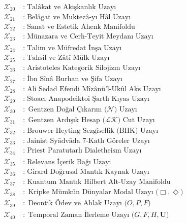 \documentclass[11pt, a4paper]{article}
\begin{document}
\begin{align}
\mathcal{X}_{20} \;&:\; \text{Talâkat ve Akışkanlık Uzayı} \\
\mathcal{X}_{21} \;&:\; \text{Belâgat ve Muktezâ-yı Hâl Uzayı} \\
\mathcal{X}_{22} \;&:\; \text{Sanat ve Estetik Ahenk Manifoldu} \\
\mathcal{X}_{23} \;&:\; \text{Münazara ve Cerh-Teyit Meydanı Uzayı} \\
\mathcal{X}_{24} \;&:\; \text{Talim ve Müfredat İnşa Uzayı} \\
\mathcal{X}_{25} \;&:\; \text{Tahsil ve Zâtî Mülk Uzayı} \\
\mathcal{X}_{26} \;&:\; \text{Aristoteles Kategorik Silojizm Uzayı} \\
\mathcal{X}_{27} \;&:\; \text{İbn Sînâ Burhan ve Şifa Uzayı} \\
\mathcal{X}_{28} \;&:\; \text{Ali Sedad Efendi Mîzânü'l-Ukûl Aks Uzayı} \\
\mathcal{X}_{29} \;&:\; \text{Stoacı Anapodeiktoi Şartlı Kıyas Uzayı} \\
\mathcal{X}_{30} \;&:\; \text{Gentzen Doğal Çıkarım ($\mathcal{N}$) Uzayı} \\
\mathcal{X}_{31} \;&:\; \text{Gentzen Ardışık Hesap ($\mathcal{L}\mathcal{K}$) Cut Uzayı} \\
\mathcal{X}_{32} \;&:\; \text{Brouwer-Heyting Sezgisellik (BHK) Uzayı} \\
\mathcal{X}_{33} \;&:\; \text{Jainist Syādvāda 7-Katlı Göreler Uzayı} \\
\mathcal{X}_{34} \;&:\; \text{Priest Paratutarlı Dialetheism Uzayı} \\
\mathcal{X}_{35} \;&:\; \text{Relevans İçerik Bağı Uzayı} \\
\mathcal{X}_{36} \;&:\; \text{Girard Doğrusal Mantık Kaynak Uzayı} \\
\mathcal{X}_{37} \;&:\; \text{Kuantum Mantık Hilbert Alt-Uzay Manifoldu} \\
\mathcal{X}_{38} \;&:\; \text{Kripke Mümkün Dünyalar Modal Uzayı ($\Box, \Diamond$)} \\
\mathcal{X}_{39} \;&:\; \text{Deontik Ödev ve Ahlak Uzayı ($O, P, F$)} \\
\mathcal{X}_{40} \;&:\; \text{Temporal Zaman İlerleme Uzayı ($G, F, H, \mathbf{U}$)}
\end{align}
\end{document}
